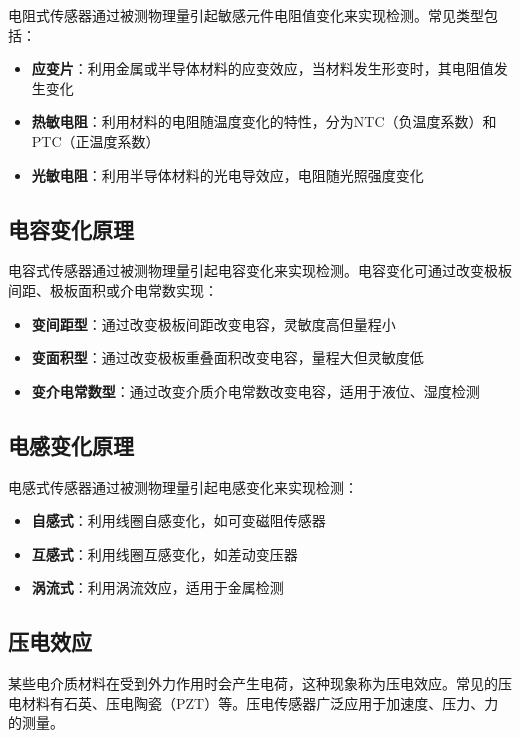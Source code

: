 \documentclass[12pt,UTF8]{ctexbook}
\begin{document}
电阻式传感器通过被测物理量引起敏感元件电阻值变化来实现检测。常见类型包括：

\begin{itemize}[leftmargin=2cm]
	\item \textbf{应变片}：利用金属或半导体材料的应变效应，当材料发生形变时，其电阻值发生变化
	\item \textbf{热敏电阻}：利用材料的电阻随温度变化的特性，分为NTC（负温度系数）和PTC（正温度系数）
	\item \textbf{光敏电阻}：利用半导体材料的光电导效应，电阻随光照强度变化
\end{itemize}

\subsection{电容变化原理}

电容式传感器通过被测物理量引起电容变化来实现检测。电容变化可通过改变极板间距、极板面积或介电常数实现：

\begin{itemize}[leftmargin=2cm]
	\item \textbf{变间距型}：通过改变极板间距改变电容，灵敏度高但量程小
	\item \textbf{变面积型}：通过改变极板重叠面积改变电容，量程大但灵敏度低
	\item \textbf{变介电常数型}：通过改变介质介电常数改变电容，适用于液位、湿度检测
\end{itemize}

\subsection{电感变化原理}

电感式传感器通过被测物理量引起电感变化来实现检测：

\begin{itemize}[leftmargin=2cm]
	\item \textbf{自感式}：利用线圈自感变化，如可变磁阻传感器
	\item \textbf{互感式}：利用线圈互感变化，如差动变压器
	\item \textbf{涡流式}：利用涡流效应，适用于金属检测
\end{itemize}

\subsection{压电效应}

某些电介质材料在受到外力作用时会产生电荷，这种现象称为压电效应。常见的压电材料有石英、压电陶瓷（PZT）等。压电传感器广泛应用于加速度、压力、力的测量。
\end{document}
